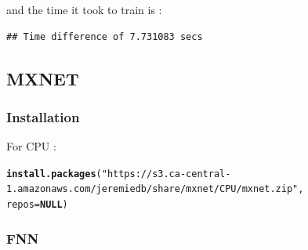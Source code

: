 \documentclass[letter,8pt]{article}\usepackage[]{graphicx}\usepackage[]{color}
\makeatletter
\newcommand{\hlstr}[1]{\textcolor[rgb]{0.192,0.494,0.8}{#1}}%
\newcommand{\hlstd}[1]{\textcolor[rgb]{0.345,0.345,0.345}{#1}}%
\newcommand{\hlkwa}[1]{\textcolor[rgb]{0.161,0.373,0.58}{\textbf{#1}}}%
\newcommand{\hlkwc}[1]{\textcolor[rgb]{0.333,0.667,0.333}{#1}}%
\newcommand{\hlkwd}[1]{\textcolor[rgb]{0.737,0.353,0.396}{\textbf{#1}}}%
\newenvironment{kframe}{%
 \def\at@end@of@kframe{}%
 \ifinner\ifhmode%
  \def\at@end@of@kframe{\end{minipage}}%
  \begin{minipage}{\columnwidth}%
 \fi\fi%
 \def\FrameCommand##1{\hskip\@totalleftmargin \hskip-\fboxsep
 \colorbox{shadecolor}{##1}\hskip-\fboxsep
     \hskip-\linewidth \hskip-\@totalleftmargin \hskip\columnwidth}%
 \MakeFramed {\advance\hsize-\width
   \@totalleftmargin\z@ \linewidth\hsize
   \@setminipage}}%
 {\par\unskip\endMakeFramed%
 \at@end@of@kframe}
\newenvironment{knitrout}{}{} %
\makeatother
\begin{document}
and the time it took to train is :
\begin{knitrout}
\color{fgcolor}\begin{kframe}
\begin{verbatim}
## Time difference of 7.731083 secs
\end{verbatim}
\end{kframe}
\end{knitrout}

\subsection{MXNET}
\subsubsection{Installation}
For CPU :
\begin{knitrout}
\color{fgcolor}\begin{kframe}
\begin{alltt}
\hlkwd{install.packages}\hlstd{(}\hlstr{"https://s3.ca-central-1.amazonaws.com/jeremiedb/share/mxnet/CPU/mxnet.zip"}\hlstd{,}
                 \hlkwc{repos} \hlstd{=} \hlkwa{NULL}\hlstd{)}
\end{alltt}
\end{kframe}
\end{knitrout}

\subsubsection{FNN}
\end{document}
